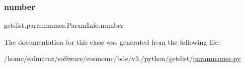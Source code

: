 \subsubsection{\texorpdfstring{number}{number}}
{\footnotesize\ttfamily getdist.\+paramnames.\+Param\+Info.\+number}



The documentation for this class was generated from the following file\+:\begin{DoxyCompactItemize}
\item 
/home/ealmaraz/software/cosmomc/bde/v3./python/getdist/\mbox{\hyperlink{paramnames_8py}{paramnames.\+py}}\end{DoxyCompactItemize}
